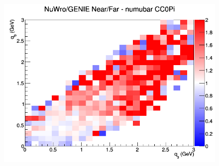 \documentclass[12pt]{article}
\begin{document}
\begin{figure}[h]
\endminipage
{}
\includegraphics[width=\linewidth]{eff_q0_q3/GAr/ratios/CC0Pi_NuWro_GENIE_numubar_NF_q3_q0.png}
\endminipage
\newline
\end{figure}
\clearpage
\end{document}
